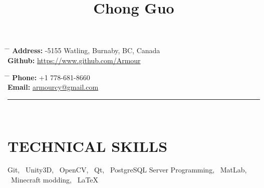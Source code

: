 \documentclass[11pt]{article} %
\begin{document}

\title{Chong Guo} %
\vspace{-1mm}


\parbox{0.5\textwidth}{ %
\begin{tabbing} %
\hspace{3cm} \= \hspace{4cm} \= \kill %
{\bf Address:} -5155 Watling, Burnaby, BC, Canada \\[2mm] %
{\bf Github:} \> \href{https://www.github.com/Armour}{https://www.github.com/Armour} \\ %
\end{tabbing}
\vspace{-4mm}
}
\hfill %
\parbox{0.5\textwidth}{ %
\begin{tabbing} %
\hspace{3cm} \= \hspace{4cm} \= \kill %
{\bf Phone:} \> +1 778-681-8660 \\[2mm] %
{\bf Email:} \> \href{mailto:armourcy@gmail.com}{armourcy@gmail.com} \\ %
\end{tabbing}
\vspace{-4mm}
}
\rule{\textwidth}{0.5mm}\\ %
\vspace{-5mm}


\section{TECHNICAL SKILLS}
\vspace{-2mm}
\vspace{-1mm}
\vspace{-1mm}
\vspace{-1mm}
\vspace{-1mm}
 {Git, \ Unity3D, \ OpenCV, \ Qt, \ PostgreSQL Server Programming, \ MatLab, \ Minecraft modding, \ \LaTeX}
\end{document}
